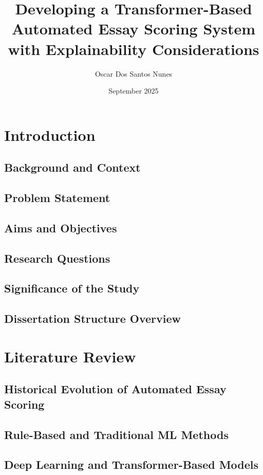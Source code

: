 \documentclass[12pt]{report}
\begin{document}
\title{Developing a Transformer-Based Automated Essay Scoring System with Explainability Considerations}
\author{Oscar Dos Santos Nunes}
\date{September 2025}
\maketitle

\tableofcontents
\newpage

\chapter{Introduction}

\section{Background and Context}


\section{Problem Statement}
\section{Aims and Objectives}
\section{Research Questions}
\section{Significance of the Study}
\section{Dissertation Structure Overview}

\chapter{Literature Review}
\section{Historical Evolution of Automated Essay Scoring}
\section{Rule-Based and Traditional ML Methods}
\section{Deep Learning and Transformer-Based Models}
\end{document}
